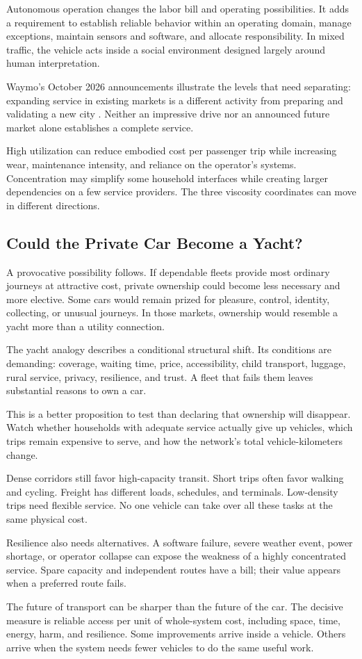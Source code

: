 Autonomous operation changes the labor bill and operating possibilities. It adds a requirement to establish reliable behavior within an operating domain, manage exceptions, maintain sensors and software, and allocate responsibility. In mixed traffic, the vehicle acts inside a social environment designed largely around human interpretation.

Waymo's October 2026 announcements illustrate the levels that need separating: expanding service in existing markets is a different activity from preparing and validating a new city \cite{waymo2026expansion,waymo2026madrid,waymo2026toronto}. Neither an impressive drive nor an announced future market alone establishes a complete service.

High utilization can reduce embodied cost per passenger trip while increasing wear, maintenance intensity, and reliance on the operator's systems. Concentration may simplify some household interfaces while creating larger dependencies on a few service providers. The three viscosity coordinates can move in different directions.

\subsection{Could the Private Car Become a Yacht?}

A provocative possibility follows. If dependable fleets provide most ordinary journeys at attractive cost, private ownership could become less necessary and more elective. Some cars would remain prized for pleasure, control, identity, collecting, or unusual journeys. In those markets, ownership would resemble a yacht more than a utility connection.

The yacht analogy describes a conditional structural shift. Its conditions are demanding: coverage, waiting time, price, accessibility, child transport, luggage, rural service, privacy, resilience, and trust. A fleet that fails them leaves substantial reasons to own a car.

This is a better proposition to test than declaring that ownership will disappear. Watch whether households with adequate service actually give up vehicles, which trips remain expensive to serve, and how the network's total vehicle-kilometers change.

Dense corridors still favor high-capacity transit. Short trips often favor walking and cycling. Freight has different loads, schedules, and terminals. Low-density trips need flexible service. No one vehicle can take over all these tasks at the same physical cost.

Resilience also needs alternatives. A software failure, severe weather event, power shortage, or operator collapse can expose the weakness of a highly concentrated service. Spare capacity and independent routes have a bill; their value appears when a preferred route fails.

The future of transport can be sharper than the future of the car. The decisive measure is reliable access per unit of whole-system cost, including space, time, energy, harm, and resilience. Some improvements arrive inside a vehicle. Others arrive when the system needs fewer vehicles to do the same useful work.
